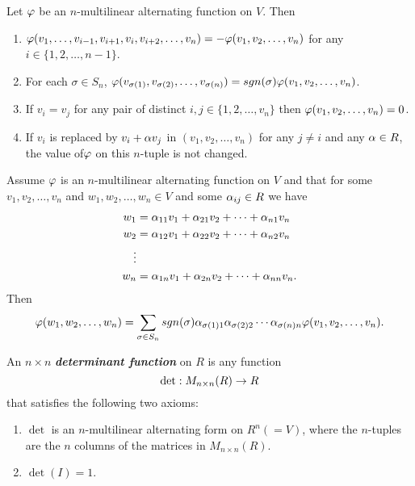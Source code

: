 \begin{prop}
Let $\varphi$ be an $n$-multilinear alternating function on $V$. Then 
\begin{enumerate}
\item $\varphi(v_1,\ldots, v_{i-1}, v_{i + 1}, v_i, v_{i + 2}, \ldots, v_n) = -\varphi(v_1, v_2, \ldots, v_n)$ for any $i\in \{1,2,\ldots, n-1\}$.

\item For each $\sigma\in S_n$, $\varphi(v_{\sigma(1)}, v_{\sigma(2)},\ldots, v_{\sigma(n)}) = sgn(\sigma)\varphi(v_1, v_2, \ldots, v_n)$.

\item If $v_i = v_j$ for any pair of distinct $i,j\in \{1,2,\ldots, v_n\}$ then $\varphi(v_1, v_2, \ldots, v_n) = 0$.

\item If $v_i$ is replaced by $v_i + \alpha v_j$ in $(v_1,v_2,\ldots,v_n)$ for any $j\neq i$ and any $\alpha \in R$, the value of$\varphi$ on this $n$-tuple is not changed.
\end{enumerate}
\end{prop}

\nl

\begin{prop}
Assume $\varphi$ is an $n$-multilinear alternating function on $V$ and that for some $v_1,v_2,\ldots,v_n$ and $w_1,w_2,\ldots,w_n\in V$ and some $\alpha_{ij}\in R$ we have
\begin{align*}
w_1 &= \alpha_{11}v_1 + \alpha_{21}v_2 + \cdots + \alpha_{n1}v_n\\
w_2 &= \alpha_{12}v_1 + \alpha_{22}v_2 + \cdots + \alpha_{n2}v_n\\
\vdots\\
w_n &= \alpha_{1n}v_1 + \alpha_{2n}v_2 + \cdots + \alpha_{nn}v_n.\\
\end{align*}
Then 
\[\varphi(w_1,w_2,\ldots,w_n) = \sum_{\sigma\in S_n} sgn(\sigma)\alpha_{\sigma(1)1}\alpha_{\sigma(2)2}\cdots\alpha_{\sigma(n)n}\varphi(v_1,v_2,\ldots,v_n).\]
\end{prop}

\nl

\begin{defn}
An $n\times n$ \textit{\textbf{determinant function}} on $R$ is any function 
\[\det:M_{n\times n}(R)\rightarrow R\]
that satisfies the following two axioms:
\begin{enumerate}
\item $\det$ is an $n$-multilinear alternating form on $R^n( = V)$, where the $n$-tuples are the $n$ columns of the matrices in $M_{n\times n}(R)$.
\item $\det(I) = 1$.
\end{enumerate}
\end{defn}


